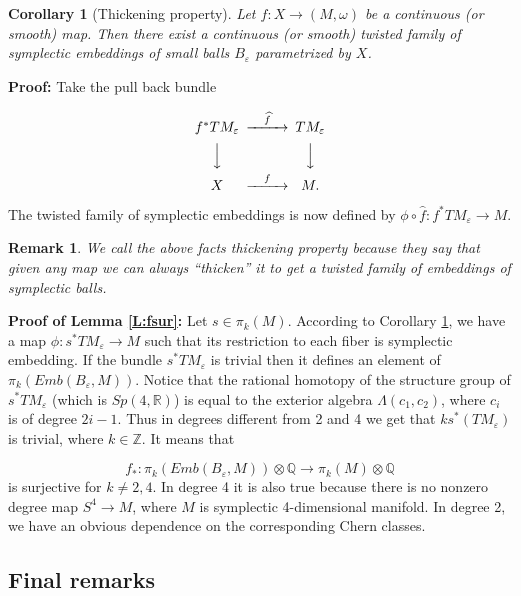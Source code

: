 \documentclass[a4paper,14pt]{article}
\newcommand{\B}[1]{\mathbb #1}
\newcommand{\eps}{{\varepsilon}}
\newcommand{\qed}{\rightline {$\Box $}}
\newcommand{\Mo}{(M,\omega )}
\newcommand{\BS}{{\bigskip}}
\newcommand{\NI}{{\noindent}}
\newtheorem{cor}[theorem]{Corollary}
\newtheorem{rem}[theorem]{Remark}
\numberwithin{equation}{section}
\numberwithin{figure}{section}
\begin{document}
\begin{cor}[Thickening property]\label{C:univ}
Let $f:X\to \Mo $ be a continuous (or smooth) map. Then there exist
a continuous (or smooth) twisted family of symplectic embeddings 
of small balls $B_{\eps}$
parametrized by $X$. 
\end{cor}

\NI
{\bf Proof:}
Take the pull back bundle 

$$
\CD
f^*TM_{\eps} @>{\widehat{f}}>> TM_{\eps}\\
@VVV                             @VVV   \\
X            @>f>>             M.
\endCD
$$

\NI
The twisted family of symplectic embeddings is now defined by
$\phi \circ \widehat {f}:f^*TM_{\eps} \to M$.

\qed



\begin{rem}
{\em
We call the above facts {\em thickening property} because
they say that given any map we can always ``thicken'' it
to get a twisted family of embeddings of symplectic balls.
}
\end{rem}






\BS
\NI
{\bf Proof of Lemma \ref{L:fsur}:}
Let $s\in \pi_k(M)$. According to Corollary \ref{C:univ}, we have
a map $\phi :s^*TM_{\eps} \to M$ such that its restriction to
each fiber is symplectic embedding. If the bundle $s^*TM_{\eps }$
is trivial then it defines an element of $\pi_k(Emb(B_{\eps},M))$.
Notice that the rational homotopy of the structure group of
$s^*TM_{\eps}$ (which is $Sp(4,\B R)$) is equal to
the exterior algebra
$\Lambda (c_1,c_2)$, where $c_i$ is of degree $2i-1$.
Thus in degrees different from 2 and 4 we get that
$ks^*(TM_{\eps})$ is trivial, where $k\in \B Z$.
It means that 

$$
f_*:\pi_k(Emb(B_{\eps},M))\otimes \B Q\to \pi_k(M)\otimes \B Q 
$$
is surjective for $k\neq 2,4$. In degree 4 it is also
true because there is no nonzero degree map
$S^4\to M$, where $M$ is symplectic 4-dimensional manifold. 
In  degree 2, we have an obvious
dependence on the corresponding Chern classes.



\qed


\subsection {Final remarks}
\end{document}
